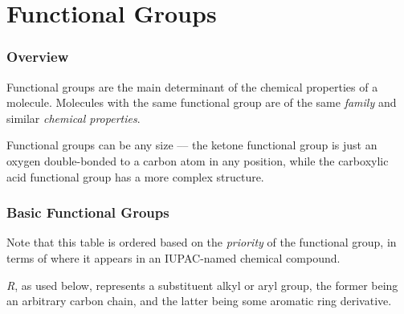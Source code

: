

\pagebreak
\part{Functional Groups}
\hypertarget{ChapterFunctionalGroups}{}

	\section{Overview}

		Functional groups are the main determinant of the chemical properties of a molecule. Molecules with the
		same functional group are of the same \textit{family} and similar \textit{chemical properties}.

		Functional groups can be any size –– the ketone functional group is just an oxygen double-bonded to a carbon atom
		in any position, while the carboxylic acid functional group has a more complex structure.


	\section{Basic Functional Groups}

		Note that this table is ordered based on the \textit{priority} of the functional group, in terms of where it appears in
		an IUPAC-named chemical compound.

		\textit{R}, as used below, represents a substituent alkyl or aryl group, the former being an arbitrary carbon chain, and the
		latter being some aromatic ring derivative.

